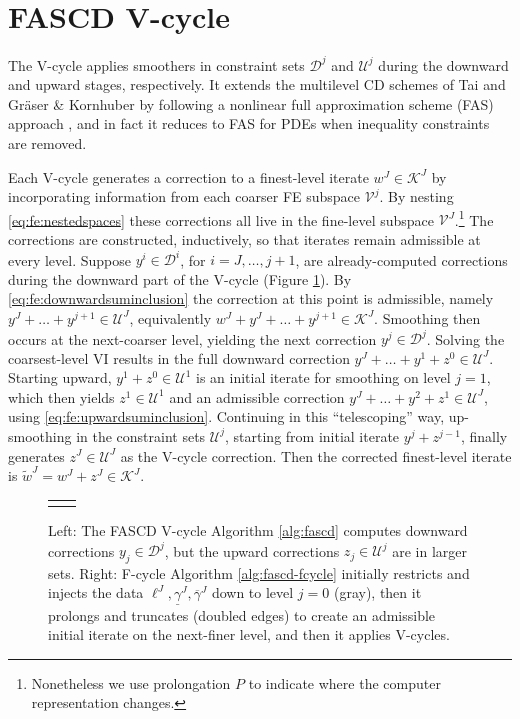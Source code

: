 \documentclass[review,hidelinks,onefignum,onetabnum]{siamart220329}
\begin{document}
\section{FASCD V-cycle} \label{sec:vcycle}

The V-cycle applies smoothers in constraint sets $\mathcal{D}^j$ and $\mathcal{U}^j$ during the downward and upward stages, respectively.  It extends the multilevel CD schemes of Tai \cite{Tai2003} and Gr\"aser \& Kornhuber \cite[Algorithm 4.7]{GraeserKornhuber2009} by following a nonlinear full approximation scheme (FAS) approach \cite{BrandtLivne2011}, and in fact it reduces to FAS for PDEs when inequality constraints are removed.

Each V-cycle generates a correction to a finest-level iterate $w^J \in \mathcal{K}^J$ by incorporating information from each coarser FE subspace $\mathcal{V}^j$.  By nesting \eqref{eq:fe:nestedspaces} these corrections all live in the fine-level subspace $\mathcal{V}^J$.\footnote{Nonetheless we use prolongation $P$ to indicate where the computer representation changes.}  The corrections are constructed, inductively, so that iterates remain admissible at every level.  Suppose $y^i \in \mathcal{D}^i$, for $i=J,\dots,j+1$, are already-computed corrections during the downward part of the V-cycle (Figure \ref{fig:fascdcycles}).  By \eqref{eq:fe:downwardsuminclusion} the correction at this point is admissible, namely $y^J + \dots + y^{j+1} \in \mathcal{U}^J$, equivalently $w^J + y^J + \dots + y^{j+1} \in \mathcal{K}^J$.  Smoothing then occurs at the next-coarser level, yielding the next correction $y^j \in \mathcal{D}^j$.  Solving the coarsest-level VI results in the full downward correction $y^J + \dots + y^1 + z^0 \in \mathcal{U}^J$.  Starting upward, $y^1 + z^0 \in \mathcal{U}^1$ is an initial iterate for smoothing on level $j=1$, which then yields $z^1 \in \mathcal{U}^1$ and an admissible correction $y^J + \dots + y^2 + z^1 \in \mathcal{U}^J$, using \eqref{eq:fe:upwardsuminclusion}.  Continuing in this ``telescoping'' way, up-smoothing in the constraint sets $\mathcal{U}^j$, starting from initial iterate $y^j+z^{j-1}$, finally generates $z^J\in \mathcal{U}^J$ as the V-cycle correction.  Then the corrected finest-level iterate is $\tilde{w}^J = w^J + z^J \in \mathcal{K}^J$.

\begin{figure}[ht]
\centering
\begin{tabular}{cc}

&

\end{tabular}
\caption{Left: The FASCD V-cycle Algorithm \ref{alg:fascd} computes downward corrections $y_j \in \mathcal{D}^j$, but the upward corrections $z_j\in\mathcal{U}^j$ are in larger sets. Right: F-cycle Algorithm \ref{alg:fascd-fcycle} initially restricts and injects the data $\ell^J,\underline{\gamma}^J,\overline{\gamma}^J$ down to level $j=0$ (gray), then it prolongs and truncates (doubled edges) to create an admissible initial iterate on the next-finer level, and then it applies V-cycles.}
\label{fig:fascdcycles}
\end{figure}
\end{document}
